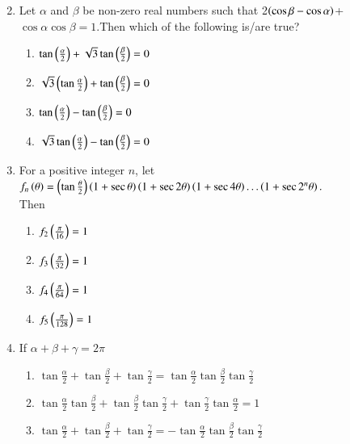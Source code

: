 \begin{enumerate}[label=\thesubsection.\arabic*,ref=\thesubsection.\theenumi]
\begin{enumerate}
\begin{multicols}{1}
\end{multicols}
\end{enumerate}
\item Let $\alpha$ and $\beta$ be non-zero real numbers such that 2$\left(\cos \beta - \cos \alpha\right)$+$\cos \alpha \cos \beta=1$.Then which of the following is/are true? \hfill{}
\begin{enumerate}
    \item $\tan{\ensuremath{\left(\frac{\alpha}{2}\right)}+\sqrt{3}\tan\ensuremath{\left(\frac{\beta}{2}\right)}}=0$
    \item $\sqrt{3}\left(\tan{\frac{\alpha}{2}}\right)+\tan\left({\frac{\beta}{2}}\right)=0$
    \item $\tan{\ensuremath{\left(\frac{\alpha}{2}\right)}}-\tan{\ensuremath{\left(\frac{\beta}{2}\right)}}=0$
    \item $\sqrt{3}\tan{\ensuremath{\left(\frac{\alpha}{2}\right)}}-\tan{\ensuremath{\left(\frac{\beta}{2}\right)}}=0$
\end{enumerate}
\item For a positive integer $n$, let \ 
$f_n\left(\theta\right) = \left(\tan\frac{\theta}{2}\right)\left(1+\sec{\theta}\right)\left(1+\sec{2\theta}\right)\left(1+\sec4\theta\right)\dots\left(1+\sec2^n{\theta}\right).$ \\Then  \hfill{}
\begin{enumerate}
    \item $f_2\left(\frac{\pi}{16}\right) = 1$
    \item $f_3\left(\frac{\pi}{32}\right) = 1$
    \item $f_4\left(\frac{\pi}{64}\right) = 1$
    \item $f_5\left(\frac{\pi}{128}\right) = 1$
\end{enumerate}

  
	\item If $\alpha+ \beta +\gamma = 2\pi$ 
		\hfill{}
  
		\begin{enumerate}
  
  
			\item $\tan\frac{\alpha}{2} + \tan\frac{\beta}{2} + \tan\frac{\gamma}{2} = \tan\frac{\alpha}{2}\tan\frac{\beta}{2}\tan\frac{\gamma}{2}$
  
  
			\item $\tan\frac{\alpha}{2}\tan\frac{\beta}{2} + \tan\frac{\beta}{2}\tan\frac{\gamma}{2}+ \tan\frac{\gamma}{2}\tan\frac{\alpha}{2} = 1$
  
			\item $\tan\frac{\alpha}{2} + \tan\frac{\beta}{2} + \tan\frac{\gamma}{2} = -\tan\frac{\alpha}{2}\tan\frac{\beta}{2}\tan\frac{\gamma}{2}$
  

\end{enumerate}
\end{enumerate}
